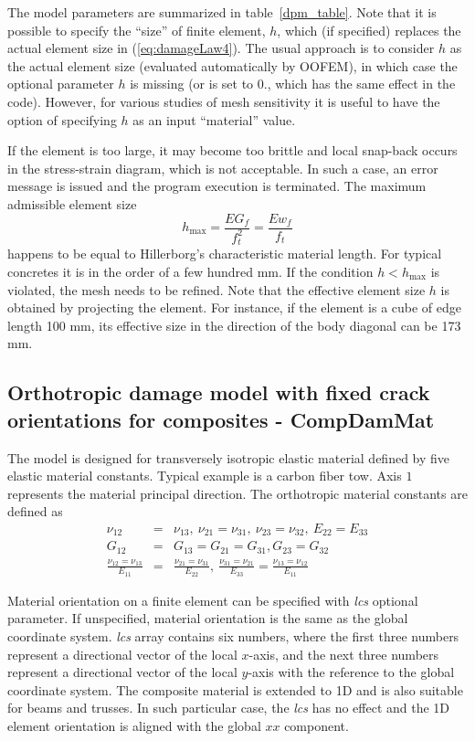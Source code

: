 \documentclass[a4paper]{article}
\newcommand{\param}[1]{{\it #1}}
\begin{document}
The model parameters are summarized
in table~\ref{dpm_table}. Note that it is possible to specify the ``size'' of finite element, $h$, which (if specified) replaces
the actual element size in  (\ref{eq:damageLaw4}). The usual approach is to consider $h$ as the actual element size (evaluated automatically by OOFEM), 
in which case the optional
parameter $h$ is missing (or is set to 0., which has the same effect in the code). However, for various studies of mesh sensitivity
it is useful to have the option of  specifying $h$ as an input ``material'' value.

If the element is too large, it may become too brittle and local snap-back
occurs in the stress-strain diagram, which is not acceptable. 
In such a case, an error message is issued and the program execution
is terminated. The maximum admissible element size 
\begin{equation}
h_{\max} = \frac{EG_f}{f_t^2} = \frac{Ew_f}{f_t}
\end{equation}
happens to be equal to Hillerborg's characteristic material length. 
For typical concretes it is in the order of a few hundred mm. 
If the condition $h<h_{\max}$ is violated, the mesh needs to be refined.
Note that the effective element size $h$ is obtained by projecting the element.
For instance, if the element is a cube of edge length 100 mm, its effective
size in the direction of the body diagonal can be 173 mm. 

\subsection{Orthotropic damage model with fixed crack orientations for composites - CompDamMat}

The model is designed for transversely isotropic elastic material defined by five elastic material constants. Typical example is a carbon fiber tow. Axis $1$ represents the material principal direction. The orthotropic material constants are defined as
\begin{eqnarray}
\nu_{12}&=&\nu_{13},~\nu_{21}=\nu_{31},~\nu_{23}=\nu_{32},~E_{22}=E_{33}\\
G_{12}&=&G_{13}=G_{21}=G_{31},G_{23}=G_{32}\\
\frac{\nu_{12}=\nu_{13}}{E_{11}} &=& \frac{\nu_{21}=\nu_{31}}{E_{22}},~\frac{\nu_{31}=\nu_{21}}{E_{33}} = \frac{\nu_{13}=\nu_{12}}{E_{11}}
\end{eqnarray}

Material orientation on a finite element can be specified with \param{lcs} optional parameter. If unspecified, material orientation is the same as the global coordinate system. \param{lcs} array contains six numbers,
where the first three numbers represent a directional vector of the local $x$-axis, and the next three numbers represent a directional vector of the local $y$-axis with the reference to the global coordinate system. The composite material is extended to 1D and is also suitable for beams and trusses. In such particular case, the \param{lcs} has no effect and the 1D element orientation is aligned with the global $xx$ component.
\end{document}
